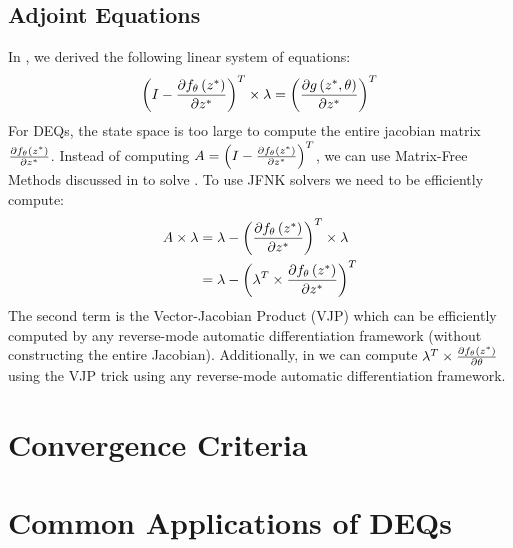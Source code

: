 

\subsection{Adjoint Equations}
\label{subsec:adjoint_equations_deqs}

In , we derived the following linear system of equations:
%
\begin{equation}
  \left( I - \frac{\partial f_\theta\left(z^*\right)}{\partial z^*} \right)^T \times \lambda = \left(\frac{\partial g\left(z^*, \theta\right)}{\partial z^*}\right)^T
\end{equation}
%
For DEQs, the state space is too large to compute the entire jacobian matrix $\frac{\partial f_\theta\left(z^*\right)}{\partial z^*}$. Instead of computing $ A = \left( I - \frac{\partial f_\theta\left(z^*\right)}{\partial z^*} \right)^T $, we can use Matrix-Free Methods discussed in  to solve . To use JFNK solvers we need to be efficiently compute:
%
\begin{align}
  A \times \lambda &= \lambda - \left( \frac{\partial f_\theta\left(z^*\right)}{\partial z^*} \right)^T  \times \lambda\\
  &= \lambda - \left( \lambda^T \times  \frac{\partial f_\theta\left(z^*\right)}{\partial z^*} \right)^T
\end{align}
%
The second term is the Vector-Jacobian Product (VJP) which can be efficiently computed by any reverse-mode automatic differentiation framework (without constructing the entire Jacobian). Additionally, in  we can compute $\lambda^T \times \frac{\partial f_\theta\left(z^*\right)}{\partial \theta}$ using the VJP trick using any reverse-mode automatic differentiation framework.

\section{Convergence Criteria}
\label{sec:ssproblem_convergence_criteria}


\section{Common Applications of DEQs}
\label{sec:common_applications_deqs}

